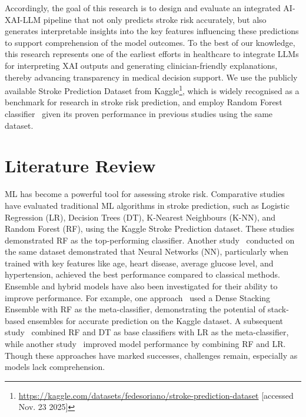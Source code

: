 \medskip
Accordingly, the goal of this research is to design and evaluate an integrated AI-XAI-LLM pipeline that not only predicts stroke risk accurately, but also generates interpretable insights into the key features influencing these predictions to support comprehension of the model outcomes. To the best of our knowledge, this research represents one of the earliest efforts in healthcare to integrate LLMs for interpreting XAI outputs and generating clinician-friendly explanations, thereby advancing transparency in medical decision support. We use the publicly available Stroke Prediction Dataset from Kaggle\footnote{\url{https://kaggle.com/datasets/fedesoriano/stroke-prediction-dataset} [accessed Nov. 23 2025]\label{fn:dataset}}, which is widely recognised as a benchmark for research in stroke risk prediction, and employ Random Forest classifier~\cite{breiman2001random} given its proven performance in previous studies using the same dataset. 

\section{Literature Review} \label{sec:review}
ML has become a powerful tool for assessing stroke risk. Comparative studies~\cite{islam2021stroke, tazin2021stroke} have evaluated traditional ML algorithms in stroke prediction, such as Logistic Regression (LR), Decision Trees (DT), K-Nearest Neighbours (K-NN), and Random Forest (RF), using the Kaggle Stroke Prediction dataset. These studies demonstrated RF as the top-performing classifier. Another study~\cite{dev2022predictive} conducted on the same dataset demonstrated that Neural Networks (NN), particularly when trained with key features like age, heart disease, average glucose level, and hypertension, achieved the best performance compared to classical methods. Ensemble and hybrid models have also been investigated for their ability to improve performance. For example, one approach~\cite{l1} used a Dense Stacking Ensemble with RF as the meta-classifier, demonstrating the potential of stack-based ensembles for accurate prediction on the Kaggle dataset. A subsequent study~\cite{l2} combined RF and DT as base classifiers with LR as the meta-classifier, while another study~\cite{l3} improved model performance by combining RF and LR. Though these approaches have marked successes, challenges remain, especially as models lack comprehension.

